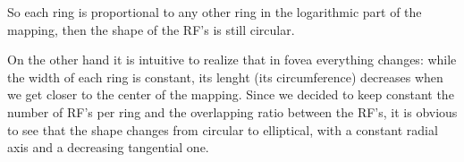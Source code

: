 \documentclass{article}
\begin{document}
So each ring is proportional to any other ring in the logarithmic part of the mapping, then the shape of the RF's is still circular.

On the other hand it is intuitive to realize that in fovea everything changes: while the width of each ring is constant, its lenght (its circumference) decreases when we get closer to the center of the mapping. Since we decided to keep constant the number of RF's per ring and the overlapping ratio between the RF's, it is obvious to see that the shape changes from circular to elliptical, with a constant radial axis and a decreasing tangential one. 
\end{document}
